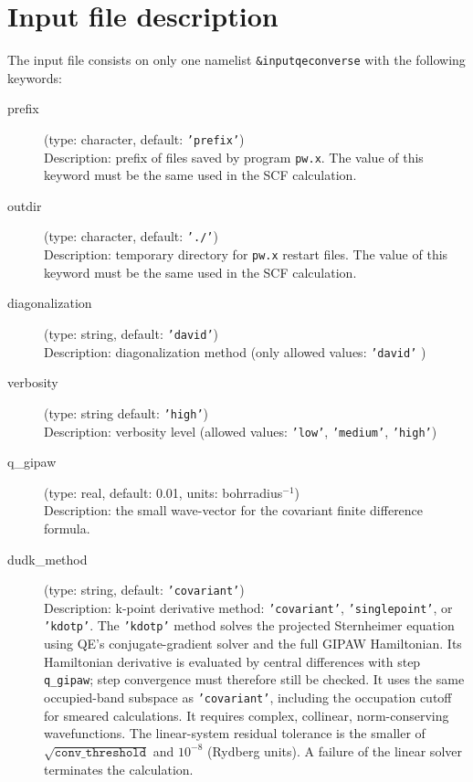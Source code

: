 \documentclass[a4paper,11pt,twoside]{article}
\begin{document}
\section{Input file description}
The input file consists on only one namelist \texttt{\&input\textunderscore{}qeconverse} with the
following keywords:
\begin{description}

\item[prefix] (type: character, default: \texttt{'prefix'})\\
Description: prefix of files saved by program \texttt{pw.x}. The value of this keyword must be the same used in the SCF calculation.

\item[outdir] (type: character, default: \texttt{'./'})\\
Description: temporary directory for \texttt{pw.x} restart files. The value of this keyword must be the same used in the SCF calculation.

\item[diagonalization] (type: string, default: \texttt{'david'})\\
Description: diagonalization method (only allowed values: \texttt{'david'} )

\item[verbosity] (type: string default: \texttt{'high'})\\
Description: verbosity level (allowed values: \texttt{'low'}, \texttt{'medium'}, \texttt{'high'})

\item[q\_gipaw] (type: real, default: 0.01, units: bohrradius$^{-1}$)\\
Description: the small wave-vector for the covariant finite difference formula.

\item[dudk\_method] (type: string, default: \texttt{'covariant'})\\
Description: k-point derivative method: \texttt{'covariant'},
\texttt{'singlepoint'}, or \texttt{'kdotp'}.
The \texttt{'kdotp'} method solves the projected Sternheimer equation using
QE's conjugate-gradient solver and the full GIPAW Hamiltonian. Its Hamiltonian
derivative is evaluated by central differences with step \texttt{q\_gipaw};
step convergence must therefore still be checked. It uses the same occupied-band
subspace as \texttt{'covariant'}, including the occupation cutoff for smeared
calculations. It requires complex, collinear, norm-conserving wavefunctions.
The linear-system residual tolerance is the smaller of
$\sqrt{\mathtt{conv\_threshold}}$ and $10^{-8}$ (Rydberg units).
A failure of the linear solver terminates the calculation.


\end{description}
\end{document}

